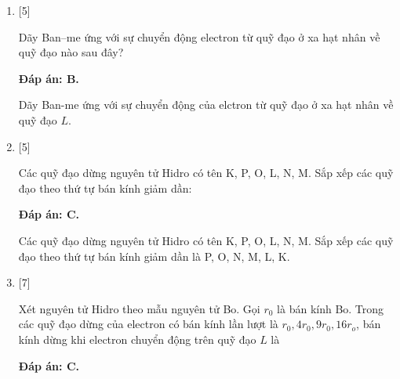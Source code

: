 \begin{enumerate}[label=\bfseries Câu \arabic*:]
		\item {} [5]
	
		\cauhoi
		{Dãy Ban–me ứng với sự chuyển động electron từ quỹ đạo ở xa hạt nhân về quỹ đạo nào sau đây?
		}
	
		\loigiai
		{		\textbf{Đáp án: B.}

Dãy Ban-me ứng với sự chuyển động của elctron từ quỹ đạo ở xa hạt nhân về quỹ  đạo $ L $.
		}	
		
		\item {} [5]
	
		\cauhoi
		{Các quỹ đạo dừng nguyên tử Hidro có tên K, P, O, L, N, M. Sắp xếp các quỹ đạo theo thứ tự bán kính giảm dần:
		}
	
		\loigiai
		{		\textbf{Đáp án: C.}

Các quỹ đạo dừng nguyên tử Hidro có tên K, P, O, L, N, M. Sắp xếp các quỹ đạo theo thứ tự bán kính giảm dần là P, O, N, M, L, K. 
		}	

		\item {} [7]
	
		\cauhoi
		{Xét nguyên tử Hidro theo mẫu nguyên tử Bo. Gọi $ r_{0} $ là bán kính Bo. Trong các quỹ đạo dừng của electron có bán kính lần lượt là $ r_{0}, 4 r_{0}, 9 r_{0}, 16 r_{o} $, bán kính dừng khi electron chuyển động trên quỹ đạo $ L $ là

		}
	
		\loigiai
		{		\textbf{Đáp án: C.}

}
\end{enumerate}
